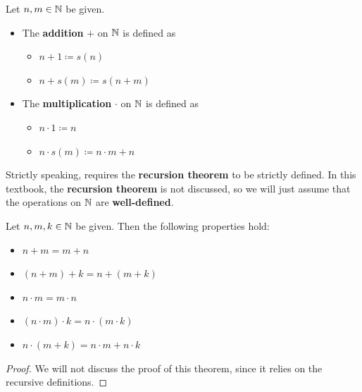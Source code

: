 \bigskip

\begin{definition} \label{an:def:operations-on-N}
    Let $n, m \in \mathbb{N}$ be given.
    \begin{itemize}
        \item The \textbf{addition} $+$ on $\mathbb{N}$ is defined as
        \begin{itemize}
            \item $n + 1 \coloneqq s(n)$
            \item $n + s(m) \coloneqq s(n + m)$
        \end{itemize}
        \item The \textbf{multiplication} $\cdot$ on $\mathbb{N}$ is defined as
        \begin{itemize}
            \item $n \cdot 1 \coloneqq n$
            \item $n \cdot s(m) \coloneqq n \cdot m + n$
        \end{itemize}
    \end{itemize}
\end{definition}

\bigskip

\begin{remark}
    Strictly speaking,  requires the \textbf{recursion theorem} to be strictly defined.
    In this textbook, the \textbf{recursion theorem} is not discussed, so we will just assume that the operations
    on $\mathbb{N}$ are \textbf{well-defined}.
\end{remark}

\bigskip

\begin{theorem} \label{an:thm:properties-of-operations-on-N}
    Let $n, m, k \in \mathbb{N}$ be given. Then the following properties hold:
    \begin{itemize}
        \item $n + m = m + n$
        \item $(n + m) + k = n + (m + k)$
        \item $n \cdot m = m \cdot n$
        \item $(n \cdot m) \cdot k = n \cdot (m \cdot k)$
        \item $n \cdot (m + k) = n \cdot m + n \cdot k$
    \end{itemize}
\end{theorem}

\begin{proof}
    We will not discuss the proof of this theorem, since it relies on the recursive definitions.
\end{proof}


